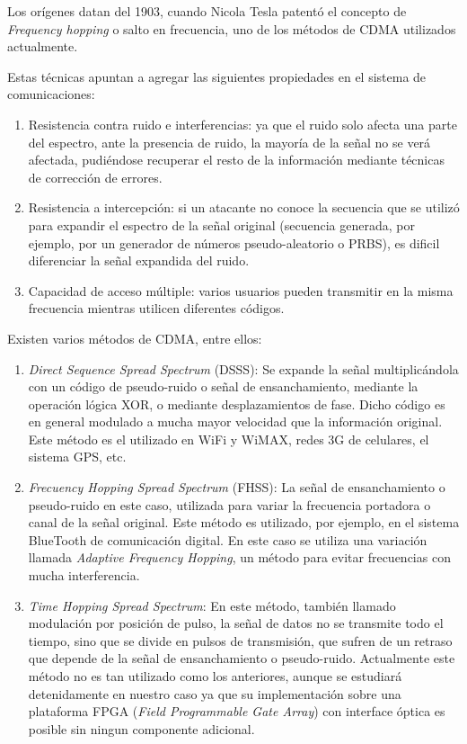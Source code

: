 Los orígenes datan del 1903, cuando Nicola Tesla patentó el concepto de \textit{Frequency hopping} o salto en frecuencia, uno de los métodos de CDMA utilizados actualmente.

Estas técnicas apuntan a agregar las siguientes propiedades en el sistema de comunicaciones:
\begin{enumerate} 
\item Resistencia contra ruido e interferencias: ya que el ruido solo afecta una parte del espectro, ante la presencia de ruido, la mayoría de la señal no se verá afectada, pudiéndose recuperar el resto de la información mediante técnicas de corrección de errores.
\item Resistencia a intercepción: si un atacante no conoce la secuencia que se utilizó para expandir el espectro de la señal original (secuencia generada, por ejemplo, por un generador de números pseudo-aleatorio o PRBS), es dificil diferenciar la señal expandida del ruido.
\item Capacidad de acceso múltiple: varios usuarios pueden transmitir en la misma frecuencia mientras utilicen diferentes códigos.
\end{enumerate} 

Existen varios métodos de CDMA, entre ellos:
\begin{enumerate} 
\item \textit{Direct Sequence Spread Spectrum} (DSSS): Se expande la señal multiplicándola con un código de pseudo-ruido o señal de ensanchamiento, mediante la operación lógica XOR, o mediante desplazamientos de fase. Dicho código es en general modulado a mucha mayor velocidad que la información original. Este método es el utilizado en WiFi y WiMAX, redes 3G de celulares, el sistema GPS, etc.
\item \textit{Frecuency Hopping Spread Spectrum} (FHSS): La señal de ensanchamiento o pseudo-ruido en este caso,  utilizada para variar la frecuencia portadora o canal de la señal original. Este método es utilizado, por ejemplo, en el sistema BlueTooth de comunicación digital. En este caso se utiliza una variación llamada \textit{Adaptive Frequency Hopping}, un método para evitar frecuencias con mucha interferencia.
\item \textit{Time Hopping Spread Spectrum}: En este método, también llamado modulación por posición de pulso, la señal de datos no se transmite todo el tiempo, sino que se divide en pulsos de transmisión, que sufren de un retraso que depende de la señal de ensanchamiento o pseudo-ruido. Actualmente este método no es tan utilizado como los anteriores, aunque se estudiará detenidamente en nuestro caso ya que su implementación sobre una plataforma FPGA (\textit{Field Programmable Gate Array}) con interface óptica es posible sin ningun componente adicional.
\end{enumerate} 


